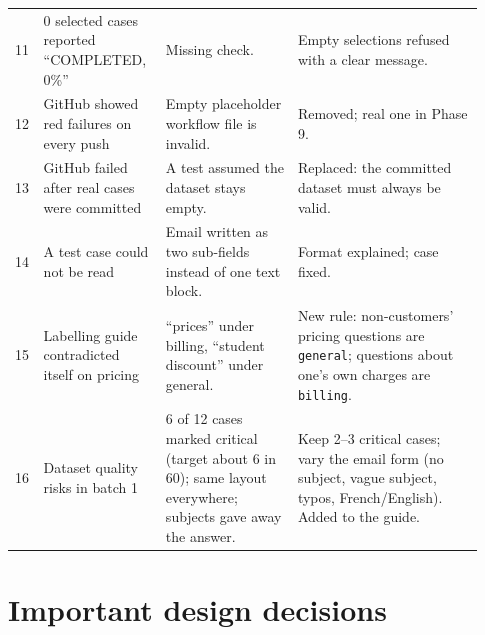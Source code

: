 \documentclass[11pt,a4paper]{article}
\newcommand{\code}[1]{\nolinkurl{#1}}
\begin{document}
\begin{longtable}{@{}p{0.03\linewidth}p{0.25\linewidth}p{0.27\linewidth}p{0.38\linewidth}@{}}
11 & 0 selected cases reported ``COMPLETED, 0\%'' & Missing check. & Empty selections refused with a clear message. \\
12 & GitHub showed red failures on every push & Empty placeholder workflow file is invalid. & Removed; real one in Phase 9. \\
13 & GitHub failed after real cases were committed & A test assumed the dataset stays empty. & Replaced: the committed dataset must always be valid. \\
14 & A test case could not be read & Email written as two sub-fields instead of one text block. & Format explained; case fixed. \\
15 & Labelling guide contradicted itself on pricing & ``prices'' under billing, ``student discount'' under general. & New rule: non-customers' pricing questions are \code{general}; questions about one's own charges are \code{billing}. \\
16 & Dataset quality risks in batch 1 & 6 of 12 cases marked critical (target about 6 in 60); same layout everywhere; subjects gave away the answer. & Keep 2--3 critical cases; vary the email form (no subject, vague subject, typos, French/English). Added to the guide. \\
\bottomrule
\end{longtable}

\section{Important design decisions}\label{sec:decisions}
\end{document}

